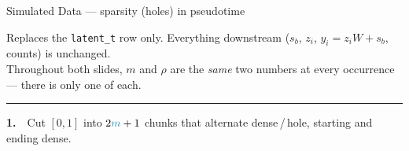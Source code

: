 \documentclass[11pt]{article}
\newcommand{\mm}{{\color{cy}m}}
\newcommand{\stepttl}[2]{{\sffamily\color{stepn}\textbf{#1}\ \ #2}}
\begin{document}
\vspace*{\fill}

{\sffamily\fontsize{24}{28}\selectfont Simulated Data \;--- sparsity (holes) in pseudotime}

\vspace{2mm}
{\sffamily\small\color{lab}Replaces the \texttt{latent\_t} row only. Everything downstream
($s_b$, $z_i$, $y_i = z_iW + s_b$, counts) is unchanged.\\
Throughout both slides, {\color{cy}$m$} and {\color{og}$\rho$} are the \emph{same} two numbers
at every occurrence --- there is only one of each.}

\vspace{2.5mm}
\hrule
\vspace{2mm}

\stepttl{1.}{Cut $[0,1]$ into $2\mm+1$ chunks that alternate dense\,/\,hole, starting and ending dense.}
\end{document}

